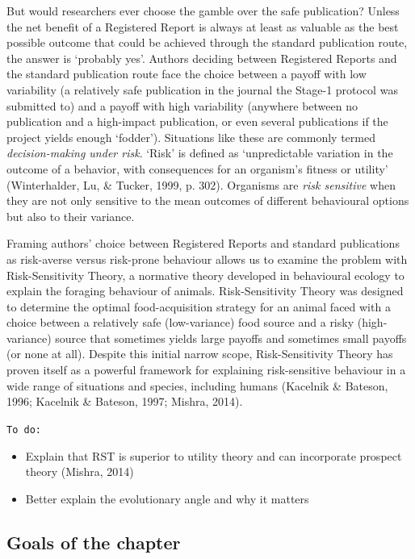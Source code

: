 \documentclass[
  ,man,mask,floatsintext]{apa6}
\providecommand{\tightlist}{%
  \setlength{\itemsep}{0pt}\setlength{\parskip}{0pt}}
\begin{document}
But would researchers ever choose the gamble over the safe publication?
Unless the net benefit of a Registered Report is always at least as valuable as the best possible outcome that could be achieved through the standard publication route, the answer is `probably yes'.
Authors deciding between Registered Reports and the standard publication route face the choice between a payoff with low variability (a relatively safe publication in the journal the Stage-1 protocol was submitted to) and a payoff with high variability (anywhere between no publication and a high-impact publication, or even several publications if the project yields enough `fodder').
Situations like these are commonly termed \emph{decision-making under risk}.
`Risk' is defined as `unpredictable variation in the outcome of a behavior, with consequences for an organism's fitness or utility' (Winterhalder, Lu, \& Tucker, 1999, p. 302).
Organisms are \emph{risk sensitive} when they are not only sensitive to the mean outcomes of different behavioural options but also to their variance.

Framing authors' choice between Registered Reports and standard publications as risk-averse versus risk-prone behaviour allows us to examine the problem with Risk-Sensitivity Theory, a normative theory developed in behavioural ecology to explain the foraging behaviour of animals.
Risk-Sensitivity Theory was designed to determine the optimal food-acquisition strategy for an animal faced with a choice between a relatively safe (low-variance) food source and a risky (high-variance) source that sometimes yields large payoffs and sometimes small payoffs (or none at all).
Despite this initial narrow scope, Risk-Sensitivity Theory has proven itself as a powerful framework for explaining risk-sensitive behaviour in a wide range of situations and species, including humans (Kacelnik \& Bateson, 1996; Kacelnik \& Bateson, 1997; Mishra, 2014).

\texttt{To\ do:}

\begin{itemize}
\tightlist
\item
  Explain that RST is superior to utility theory and can incorporate prospect theory (Mishra, 2014)
\item
  Better explain the evolutionary angle and why it matters
\end{itemize}

\hypertarget{goals-of-the-chapter}{%
\subsection{Goals of the chapter}\label{goals-of-the-chapter}}
\end{document}
